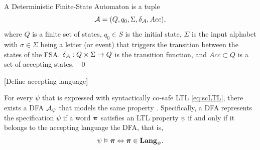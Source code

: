 \documentclass{ifacconf}
\newcommand{\red}[1]{{\color{red} #1}}
\begin{document}
\begin{definition}
A Deterministic Finite-State Automaton is a tuple
 \[\mathcal{A} = (Q, q_0, \Sigma, \delta_{\mathcal{A}}, Acc),\] where %
$Q$ is a finite set of states, $q_0 \in S$ is the initial state,
$\Sigma$ is the input alphabet with $\sigma\in\Sigma$ being a letter (or event) that triggers the transition between the states of the FSA.   
$\delta_{\mathcal{A}} : Q \times \Sigma \rightarrow Q$ is the transition function, and
$Acc\subset Q$ is a set of accepting states. \hfill \mbox{ }\qed
\end{definition}

\red{[Define accepting language]}






For every $\psi$ that is expressed with syntactically co-safe LTL  \eqref{eq:scLTL}, there exists a DFA  $\mathcal{A}_\psi$ that models the same property \citep{Belta2017}. Specifically, a DFA represents the specification $\psi$ if a word ${\boldsymbol{\pi}}$ satisfies an LTL property $\psi$ if and only if it belongs to the accepting language the DFA, that is,
	 \[\psi\vDash{\boldsymbol{\pi}} \Leftrightarrow {\boldsymbol{\pi}}\in \mathbf{Lang}_\psi.\]
\end{document}
